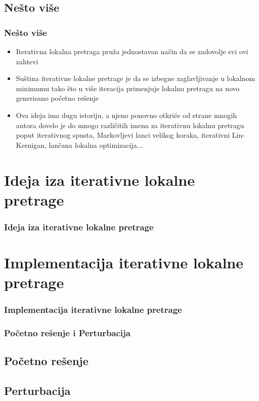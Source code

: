 \documentclass{beamer}
\begin{document}
\subsection*{Nešto više}
\begin{frame}[fragile]
	\frametitle{Nešto više}
	\begin{itemize}
		\item Iterativna lokalna pretraga pruža jednostavan način da se zadovolje svi ovi zahtevi
		\item Suština iterativne lokalne pretrage je da se izbegne zaglavljivanje u lokalnom minimumu tako što u više iteracija primenjuje lokalnu pretragu na novo generisano početno rešenje
		\item Ova ideja ima dugu istoriju, a njeno ponovno otkriće od strane mnogih autora dovelo je do mnogo različitih imena za iterativnu lokalnu pretragu poput iterativnog spusta, Markovljevi lanci velikog koraka, iterativni Lin-Kernigan, lančana lokalna optimizacija...
	\end{itemize}

\end{frame}

\section{Ideja iza iterativne lokalne pretrage}
\begin{frame}
	\frametitle{Ideja iza iterativne lokalne pretrage} 

\end{frame}

\section{Implementacija iterativne lokalne pretrage}
\begin{frame}[fragile]\frametitle{Implementacija iterativne lokalne pretrage}
 
\end{frame}

\begin{frame}[fragile]\frametitle{Početno rešenje i Perturbacija}
	\subsection{Početno rešenje}
	\subsection{Perturbacija}

\end{frame}
\end{document}
